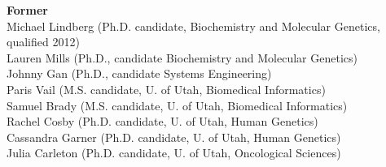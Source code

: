 \documentclass[margin,line]{cv}
\begin{document}
\begin{resume}
    \textbf{Former} \\
    Michael Lindberg (Ph.D. candidate, Biochemistry and Molecular Genetics, qualified 2012)\\
    Lauren Mills (Ph.D., candidate Biochemistry and Molecular Genetics)\\
	Johnny Gan (Ph.D., candidate Systems Engineering) \\
    Paris Vail (M.S. candidate, U. of Utah, Biomedical Informatics) \\
    Samuel Brady (M.S. candidate, U. of Utah, Biomedical Informatics)\\
    Rachel Cosby (Ph.D. candidate, U. of Utah, Human Genetics)\\
    Cassandra Garner (Ph.D. candidate, U. of Utah, Human Genetics)\\
    Julia Carleton (Ph.D. candidate, U. of Utah, Oncological Sciences)\\



\end{resume}
\end{document}
